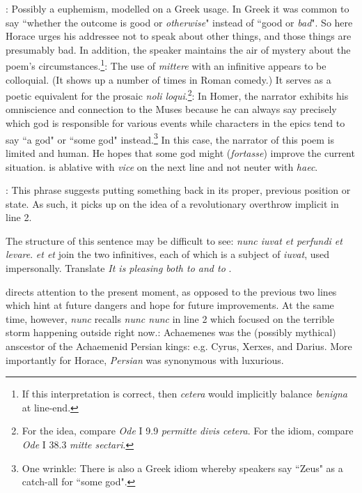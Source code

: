 : Possibly a euphemism, modelled on a Greek usage.  In Greek it was common to say ``whether the outcome is good or \textit{otherwise}" instead of ``good or \textit{bad}".  So here Horace urges his addressee not to speak about other things, and those things are presumably bad.  In addition, the speaker maintains the air of mystery about the poem's circumstances.\footnote{If this interpretation is correct, then \textit{cetera} would implicitly balance \textit{benigna} at line-end.}\indent{}: The use of \textit{mittere} with an infinitive appears to be colloquial.  (It shows up a number of times in Roman comedy.)  It serves as a poetic equivalent for the prosaic \textit{noli loqui}.\footnote{For the idea, compare \textit{Ode} I 9.9 \textit{permitte divis cetera}. For the idiom, compare \textit{Ode} I 38.3 \textit{mitte sectari}.}\indent{}: In Homer, the narrator exhibits his omniscience and connection to the Muses because he can always say precisely which god is responsible for various events while characters in the epics tend to say ``a god" or ``some god" instead.\footnote{One wrinkle: There is also a Greek idiom whereby speakers say ``Zeus" as a catch-all for ``some god".} In this case, the narrator of this poem is limited and human.  He hopes that some god might (\textit{fortasse}) improve the current situation.\indent{} is ablative with \textit{vice} on the next line and not neuter with \textit{haec}.


: This phrase suggests putting something back in its proper, previous position or state.  As such, it picks up on the idea of a revolutionary overthrow implicit in line 2.


The structure of this sentence may be difficult to see: \textit{nunc iuvat et perfundi et levare}.  \textit{et \lips et} join the two infinitives, each of which is a subject of \textit{iuvat}, used impersonally.  Translate \textit{It is pleasing both to \lips and to \lips}.


 directs attention to the present moment, as opposed to the previous two lines which hint at future dangers and hope for future improvements.  At the same time, however, \textit{nunc} recalls \textit{nunc \lips nunc} in line 2 which focused on the terrible storm happening outside right now.\indent{}: Achaemenes was the (possibly mythical) anscestor of the Achaemenid Persian kings: e.g. Cyrus, Xerxes, and Darius.  More importantly for Horace, \textit{Persian} was synonymous with luxurious.

